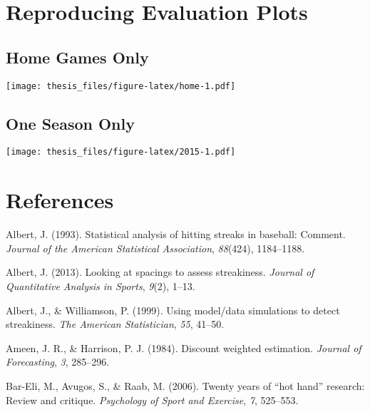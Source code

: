 \documentclass[12pt,twoside]{dukestatscithesis}
\theoremstyle{definition}
\theoremstyle{definition}
\theoremstyle{definition}
\theoremstyle{remark}
\begin{document}
\chapter{Reproducing Evaluation
Plots}\label{reproducing-evaluation-plots}

\section{Home Games Only}\label{home-games-only}

\texttt{[image: thesis\_files/figure-latex/home-1.pdf]}

\section{One Season Only}\label{one-season-only}

\texttt{[image: thesis\_files/figure-latex/2015-1.pdf]}

\backmatter

\chapter*{References}\label{references}


\noindent

\setlength{\parindent}{-0.20in} \setlength{\leftskip}{0.20in}
\setlength{\parskip}{8pt}

\hypertarget{refs}{}
\hypertarget{ref-albert93}{}
Albert, J. (1993). Statistical analysis of hitting streaks in baseball:
Comment. \emph{Journal of the American Statistical Association},
\emph{88}(424), 1184--1188.

\hypertarget{ref-albert13}{}
Albert, J. (2013). Looking at spacings to assess streakiness.
\emph{Journal of Quantitative Analysis in Sports}, \emph{9}(2), 1--13.

\hypertarget{ref-albert99}{}
Albert, J., \& Williamson, P. (1999). Using model/data simulations to
detect streakiness. \emph{The American Statistician}, \emph{55}, 41--50.

\hypertarget{ref-ameen84}{}
Ameen, J. R., \& Harrison, P. J. (1984). Discount weighted estimation.
\emph{Journal of Forecasting}, \emph{3}, 285--296.

\hypertarget{ref-bareli06}{}
Bar-Eli, M., Avugos, S., \& Raab, M. (2006). Twenty years of ``hot
hand'' research: Review and critique. \emph{Psychology of Sport and
Exercise}, \emph{7}, 525--553.
\end{document}
